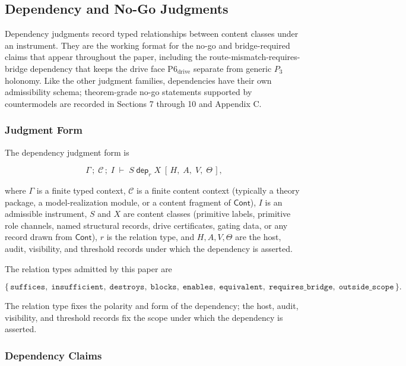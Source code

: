 \documentclass[11pt]{article}
\theoremstyle{definition}
\begin{document}
\subsection{Dependency and No-Go Judgments}

Dependency judgments record typed relationships between content classes under an instrument. They are the working format for the no-go and bridge-required claims that appear throughout the paper, including the route-mismatch-requires-bridge dependency that keeps the drive face \(\mathrm{P6}_{\mathrm{drive}}\) separate from generic \(P_3\) holonomy. Like the other judgment families, dependencies have their own admissibility schema; theorem-grade no-go statements supported by countermodels are recorded in Sections 7 through 10 and Appendix C.

\subsubsection{Judgment Form}

The dependency judgment form is

\[
\Gamma\,;\;\mathcal C\,;\;I\;\vdash\;S\;\mathrel{\mathsf{dep}_r}\;X\;[\,H,\;A,\;V,\;\Theta\,],
\]

where \(\Gamma\) is a finite typed context, \(\mathcal C\) is a finite content context (typically a theory package, a model-realization module, or a content fragment of \(\mathsf{Cont}\)), \(I\) is an admissible instrument, \(S\) and \(X\) are content classes (primitive labels, primitive role channels, named structural records, drive certificates, gating data, or any record drawn from \(\mathsf{Cont}\)), \(r\) is the relation type, and \(H,A,V,\Theta\) are the host, audit, visibility, and threshold records under which the dependency is asserted.

The relation types admitted by this paper are

\[
\{\,\texttt{suffices},\;\texttt{insufficient},\;\texttt{destroys},\;\texttt{blocks},\;\texttt{enables},\;\texttt{equivalent},\;\texttt{requires\_bridge},\;\texttt{outside\_scope}\,\}.
\]

The relation type fixes the polarity and form of the dependency; the host, audit, visibility, and threshold records fix the scope under which the dependency is asserted.

\subsubsection{Dependency Claims}
\end{document}
